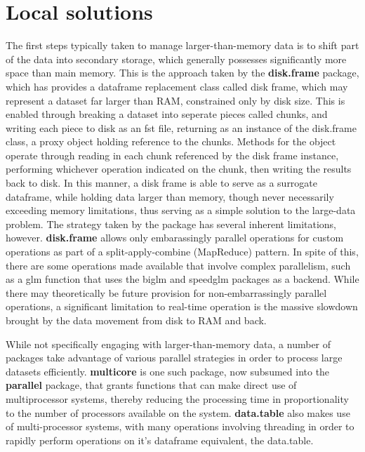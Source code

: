 \documentclass[a4paper,10pt]{article}
\begin{document}
\section{Local solutions}
\label{local}

The first steps typically taken to manage larger-than-memory data is to shift
part of the data into secondary storage, which generally possesses
significantly more space than main memory.
This is the approach taken by the \textbf{disk.frame} package, which has provides a dataframe replacement class called disk frame, which may represent a dataset far larger than RAM, constrained only by disk size\cite{zj20}.
This is enabled through breaking a dataset into seperate pieces called chunks, and writing each piece to disk as an fst file, returning as an instance of the disk.frame class, a proxy object holding reference to the chunks.
Methods for the object operate through reading in each chunk referenced by the disk frame instance, performing whichever operation indicated on the chunk, then writing the results back to disk. In this manner, a disk frame is able to serve as a surrogate dataframe, while holding data larger than memory, though never necessarily exceeding memory limitations, thus serving as a simple solution to the large-data problem.
The strategy taken by the package has several inherent limitations, however.
\textbf{disk.frame} allows only embarassingly parallel operations for custom operations as part of a split-apply-combine (MapReduce) pattern. In spite of this, there are some operations made available that involve complex parallelism, such as a glm function that uses the biglm and speedglm packages as a backend.
While there may theoretically be future provision for non-embarrassingly parallel operations, a significant limitation to real-time operation is the massive slowdown brought by the data movement from disk to RAM and back.

While not specifically engaging with larger-than-memory data, a number of packages take advantage of various parallel strategies in order to process large datasets efficiently.
\textbf{multicore} is one such package, now subsumed into the \textbf{parallel} package, that grants functions that can make direct use of multiprocessor systems, thereby reducing the processing time in proportionality to the number of processors available on the system.
\textbf{data.table} also makes use of multi-processor systems, with many operations involving threading in order to rapidly perform operations on it's dataframe equivalent, the data.table.
\end{document}
